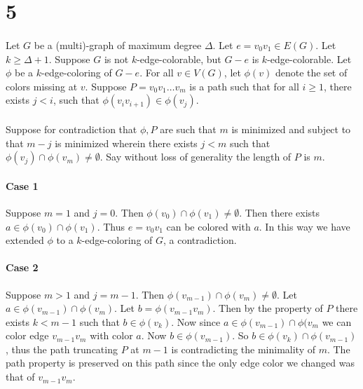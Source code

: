 \documentclass[letterpaper,12pt,oneside,onecolumn]{report}
\begin{document}
\section*{5}
\paragraph{}
Let $G$ be a (multi)-graph of maximum degree $\Delta$. Let $e = v_0v_1 \in E(G)$. Let $k \geq \Delta + 1$. Suppose $G$ is not $k$-edge-colorable, but $G-e$ is $k$-edge-colorable. Let $\phi$ be a $k$-edge-coloring of $G-e$. For all $v \in V(G)$, let $\phi(v)$ denote the set of colors missing at $v$. Suppose $P = v_0v_1\dots v_m$ is a path such that for all $i \geq 1$, there exists $j < i$, such that $\phi(v_iv_{i+1}) \in \phi(v_j)$.
\paragraph{}
Suppose for contradiction that $\phi, P$ are such that $m$ is minimized and subject to that $m-j$ is minimized wherein there exists $j < m$ such that $\phi(v_j) \cap \phi(v_m) \neq \emptyset$. Say without loss of generality the length of $P$ is $m$.
\paragraph{Case 1}
Suppose $m=1$ and $j=0$. Then $\phi(v_0) \cap \phi(v_1) \neq \emptyset$. Then there exists $a \in \phi(v_0) \cap \phi(v_1)$. Thus $e=v_0v_1$ can be colored with $a$. In this way we have extended $\phi$ to a $k$-edge-coloring of $G$, a contradiction.
\paragraph{Case 2}
Suppose $m > 1$ and $j=m-1$. Then $\phi(v_{m-1}) \cap \phi(v_m) \neq \emptyset$.  Let $a \in \phi(v_{m-1}) \cap \phi(v_m)$. Let $b = \phi(v_{m-1}v_m)$. Then by the property of $P$ there exists $k < m-1$ such that $b \in \phi(v_k)$. Now since $a \in \phi(v_{m-1}) \cap \phi(v_m$ we can color edge $v_{m-1}v_m$ with color $a$. Now $b \in \phi(v_{m-1})$. So $b \in \phi(v_k) \cap \phi(v_{m-1})$, thus the path truncating $P$ at $m-1$ is contradicting the minimality of $m$. The path property is preserved on this path since the only edge color we changed was that of $v_{m-1}v_m$.
\end{document}
